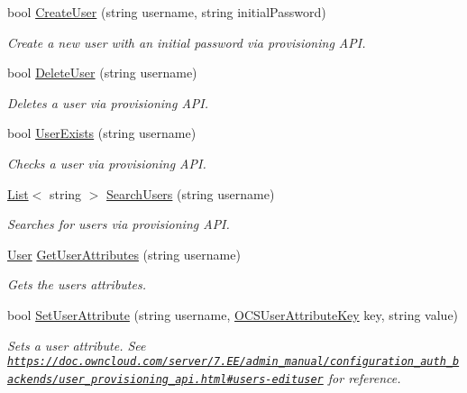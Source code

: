 \begin{DoxyCompactItemize}
bool \hyperlink{classowncloudsharp_1_1_client_a7e285455e3f0cf437d9359956b6feaa5}{Create\+User} (string username, string initial\+Password)
\begin{DoxyCompactList}\small\item\em Create a new user with an initial password via provisioning A\+PI. \end{DoxyCompactList}\item 
bool \hyperlink{classowncloudsharp_1_1_client_a0603de03c323c55dc53cea24516ecf31}{Delete\+User} (string username)
\begin{DoxyCompactList}\small\item\em Deletes a user via provisioning A\+PI. \end{DoxyCompactList}\item 
bool \hyperlink{classowncloudsharp_1_1_client_a59adb4a3ad62adbaad112c1a6fa8201e}{User\+Exists} (string username)
\begin{DoxyCompactList}\small\item\em Checks a user via provisioning A\+PI. \end{DoxyCompactList}\item 
\hyperlink{classowncloudsharp_1_1_client_a914c144ebbe207958829523f7eda3609}{List}$<$ string $>$ \hyperlink{classowncloudsharp_1_1_client_ae50362f45f53ffe21fde6651f0873c0e}{Search\+Users} (string username)
\begin{DoxyCompactList}\small\item\em Searches for users via provisioning A\+PI. \end{DoxyCompactList}\item 
\hyperlink{classowncloudsharp_1_1_types_1_1_user}{User} \hyperlink{classowncloudsharp_1_1_client_ad3907603f1510c65ec3de52897257457}{Get\+User\+Attributes} (string username)
\begin{DoxyCompactList}\small\item\em Gets the user\textquotesingle{}s attributes. \end{DoxyCompactList}\item 
bool \hyperlink{classowncloudsharp_1_1_client_af1329fb22579de086775bf5d029cc6e3}{Set\+User\+Attribute} (string username, \hyperlink{namespaceowncloudsharp_a5896a4bf1799666b1f52193038b27685}{O\+C\+S\+User\+Attribute\+Key} key, string value)
\begin{DoxyCompactList}\small\item\em Sets a user attribute. See \href{https://doc.owncloud.com/server/7.0EE/admin_manual/configuration_auth_backends/user_provisioning_api.html#users-edituser}{\tt https\+://doc.\+owncloud.\+com/server/7.\+E\+E/admin\+\_\+manual/configuration\+\_\+auth\+\_\+backends/user\+\_\+provisioning\+\_\+api.\+html\#users-\/edituser} for reference. \end{DoxyCompactList}\item 

\end{DoxyCompactItemize}
